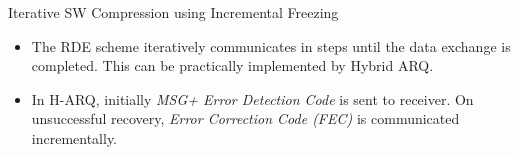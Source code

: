 \documentclass[final,hyperref={pdfpagelabels=false}]{beamer}
\begin{document}
\begin{frame}[t]
\begin{columns}[t]
\begin{column}{.465\textwidth}
            
\begin{block}{Iterative SW Compression using Incremental Freezing }
\begin{itemize}
\item The RDE scheme iteratively communicates in steps until the data exchange is completed. This can be practically implemented by Hybrid ARQ.
\item In H-ARQ, initially \emph{MSG+ Error Detection Code} is sent to receiver. On unsuccessful recovery, \emph{Error Correction Code (FEC)} is communicated incrementally. 
\end{itemize}


\end{block}
\end{column}
\end{columns}
\end{frame}
\end{document}
